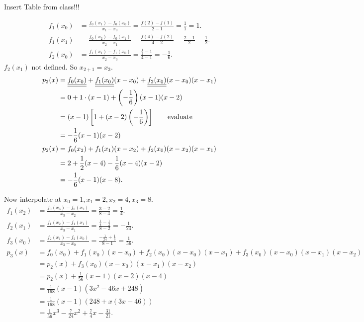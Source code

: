 \documentclass[]{article}
\begin{document}
	Insert Table from class!!!

	\begin{align*}
		f_1(x_0) &= \frac{f_0(x_1)-f_0(x_0)}{x_1-x_0} = \frac{f(2)-f(1)}{2-1} = \frac11 = 1. \\
		f_1(x_1) &= \frac{f_0(x_2)-f_0(x_1)}{x_2-x_1} = \frac{f(4)-f(2)}{4-2} = \frac{2-1}2 = \frac12. \\
		f_2(x_0) &= \frac{f_1(x_1)-f_1(x_0)}{x_2-x_0} = \frac{\frac12-1}{4-1} =-\frac16.
	\end{align*}
	$f_2(x_1)$ not defined. So $x_{2+1}=x_3$.
	\begin{align*}
		p_2(x) &= \underline{\underline{f_0(x_0)}} + \underline{\underline{f_1(x_0)}}(x-x_0) + \underline{\underline{f_2(x_0)}}(x-x_0)(x-x_1) \\
			   &= 0 + 1\cdot(x-1)+ \left(-\frac16\right)(x-1)(x-2) \\
			   &= (x-1)\left[1+(x-2)\left(-\frac16\right)\right] \qquad \text{evaluate} \\
			   &= -\frac16(x-1)(x-2) \\
		p_2(x) &= f_0(x_2) + f_1(x_1)(x-x_2) + f_2(x_0)(x-x_2)(x-x_1) \\
			   &= 2 + \frac12(x-4) - \frac16(x-4)(x-2) \\
			   &= -\frac16(x-1)(x-8).
	\end{align*}
\begin{example}
	[continued] Now interpolate at $x_0=1,x_1=2,x_2=4,x_3=8$.
	\begin{align*}
		f_1(x_2) &= \frac{f_0(x_3)-f_0(x_2)}{x_3-x_2} = \frac{3-2}{8-4} = \frac14. \\
		f_2(x_1) &= \frac{f_1(x_2)-f_1(x_1)}{x_3-x_1} = \frac{\frac14-\frac12}{8-2} = -\frac1{24}. \\
		f_3(x_0) &= \frac{f_2(x_1)-f_2(x_0)}{x_3-x_0} = \frac{-\frac1{24}+\frac16}{8-1} = \frac1{56}. \\
		p_3(x) &= f_0(x_0) + f_1(x_0)(x-x_0) + f_2(x_0)(x-x_0)(x-x_1) + f_3(x_0)(x-x_0)(x-x_1)(x-x_2) \\
			   &= p_2(x) + f_3(x_0)(x-x_0)(x-x_1)(x-x_2) \\
			   &= p_2(x) + \frac1{56}(x-1)(x-2)(x-4) \\
			   &= \frac1{168}(x-1)(3x^2-46x+248) \\
			   &= \frac1{168}(x-1)(248+x(3x-46)) \\
			   &= \frac1{56}x^3 - \frac7{24}x^2 + \frac74x - \frac{31}{21}.
	\end{align*}
\end{example}
\end{document}

